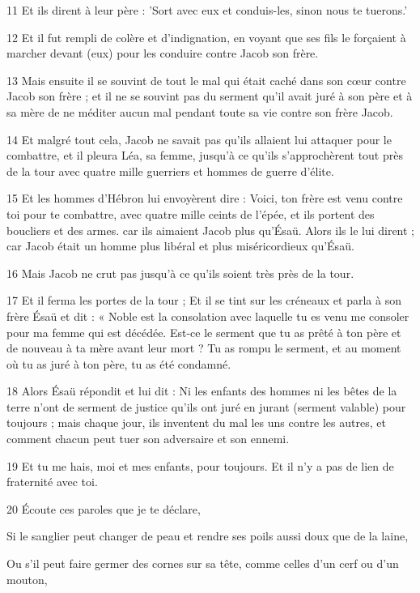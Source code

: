 \par 11 Et ils dirent à leur père : 'Sort avec eux et conduis-les, sinon nous te tuerons.'
\par 12 Et il fut rempli de colère et d'indignation, en voyant que ses fils le forçaient à marcher devant (eux) pour les conduire contre Jacob son frère.
\par 13 Mais ensuite il se souvint de tout le mal qui était caché dans son cœur contre Jacob son frère ; et il ne se souvint pas du serment qu'il avait juré à son père et à sa mère de ne méditer aucun mal pendant toute sa vie contre son frère Jacob.
\par 14 Et malgré tout cela, Jacob ne savait pas qu'ils allaient lui attaquer pour le combattre, et il pleura Léa, sa femme, jusqu'à ce qu'ils s'approchèrent tout près de la tour avec quatre mille guerriers et hommes de guerre d'élite.
\par 15 Et les hommes d'Hébron lui envoyèrent dire : Voici, ton frère est venu contre toi pour te combattre, avec quatre mille ceints de l'épée, et ils portent des boucliers et des armes. car ils aimaient Jacob plus qu'Ésaü. Alors ils le lui dirent ; car Jacob était un homme plus libéral et plus miséricordieux qu'Ésaü.
\par 16 Mais Jacob ne crut pas jusqu'à ce qu'ils soient très près de la tour.
\par 17 Et il ferma les portes de la tour ; Et il se tint sur les créneaux et parla à son frère Ésaü et dit : « Noble est la consolation avec laquelle tu es venu me consoler pour ma femme qui est décédée. Est-ce le serment que tu as prêté à ton père et de nouveau à ta mère avant leur mort ? Tu as rompu le serment, et au moment où tu as juré à ton père, tu as été condamné.
\par 18 Alors Ésaü répondit et lui dit : Ni les enfants des hommes ni les bêtes de la terre n'ont de serment de justice qu'ils ont juré en jurant (serment valable) pour toujours ; mais chaque jour, ils inventent du mal les uns contre les autres, et comment chacun peut tuer son adversaire et son ennemi.
\par 19 Et tu me hais, moi et mes enfants, pour toujours. Et il n’y a pas de lien de fraternité avec toi.
\par 20 Écoute ces paroles que je te déclare,
\par    
\par     Si le sanglier peut changer de peau et rendre ses poils aussi doux que de la laine,  
\par     Ou s'il peut faire germer des cornes sur sa tête, comme celles d'un cerf ou d'un mouton,  
